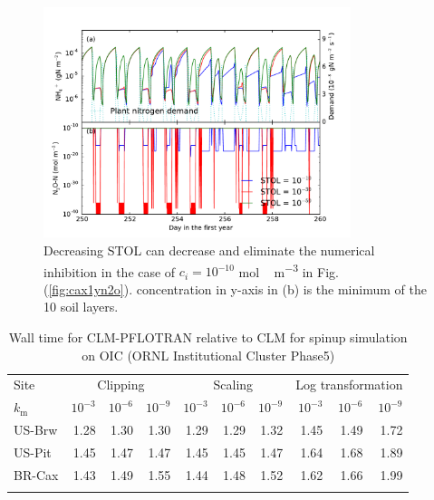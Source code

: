 \documentclass[gmd, manuscript]{copernicus}
\begin{document}
\begin{figure}[t]
\includegraphics[width=0.8\textwidth]{../figs/fig19/cax1yn2ostol0.pdf}
\caption{Decreasing STOL can decrease and eliminate the numerical inhibition in
the case of $c_i = 10^{-10}$  \unit{mol\,m^{-3}}  in Fig. (\ref{fig:cax1yn2o}).
 concentration in y-axis in (b) is the minimum of the 10 soil
layers.}
\label{fig:cax1yn2osto0}
\end{figure}

\clearpage

\begin{table}[t]
\caption{Wall time for CLM-PFLOTRAN relative to CLM for spinup simulation on OIC (ORNL Institutional Cluster Phase5)}
\label{tab:computingtime}
\begin{tabular}{lrrrrrrrrr}
\tophline
Site & \multicolumn{3}{c}{Clipping}  & \multicolumn{3}{c}{Scaling} & \multicolumn{3}{c}{Log transformation} \\
\middlehline
$k_\text{m}$ & $10^{-3}$ & $10^{-6}$ & $10^{-9}$ &  $10^{-3}$ & $10^{-6}$ & $10^{-9}$ & $10^{-3}$ & $10^{-6}$ & $10^{-9}$\\
\middlehline
US-Brw & 1.28	& 1.30 &	1.30	& 1.29	& 1.29	& 1.32	& 1.45	& 1.49	& 1.72 \\
US-Pit   & 1.45	& 1.47 &	1.47	& 1.45	& 1.45	& 1.47	& 1.64	& 1.68	& 1.89 \\
BR-Cax & 1.43	& 1.49 &	1.55	& 1.44	& 1.48	& 1.52	& 1.62	& 1.66	& 1.99 \\
\bottomhline
\end{tabular}
\end{table}
\end{document}
